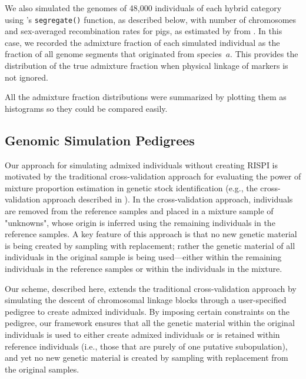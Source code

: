 We also simulated the genomes of 48,000 individuals of each
hybrid category using \gscramble{}'s {\footnotesize\tt segregate()} function, as described
below, with number of chromosomes and sex-averaged recombination rates
for pigs, as estimated by from \citet{tortereau2012high}. In this case, we recorded the
admixture fraction of each simulated individual as the fraction of all genome segments
that originated from species~$a$.  This provides the distribution of the true admixture fraction
when physical linkage of markers is not ignored.  

All the admixture fraction distributions were summarized by plotting them as histograms
so they could be compared easily.  


\subsection*{Genomic Simulation Pedigrees}

Our approach for simulating admixed individuals without creating RISPI is motivated by the traditional cross-validation
approach for evaluating the power of mixture proportion
estimation in genetic stock identification (e.g., the cross-validation approach
described in \citealt{moran2019bayesian}).
In the cross-validation approach, individuals are removed from the reference
samples and placed in a mixture sample of "unknowns", whose origin
is inferred using the remaining individuals in the reference samples.  A key
feature of this approach is that no new genetic material is being created by
sampling with replacement; rather the genetic material of all individuals
in the original sample is being used---either within the remaining individuals in the
reference samples or within the individuals in the mixture.

Our scheme, described here, extends the traditional cross-validation approach
by simulating the descent of chromosomal linkage blocks through a user-specified
pedigree to create admixed individuals.  By imposing certain constraints
on the pedigree, our framework ensures that all the genetic material
within the original individuals is used to either create admixed individuals or is retained
within reference individuals (i.e., those that are purely of one
putative subopulation), and yet no new genetic material is
created by sampling with replacement from the original samples.

